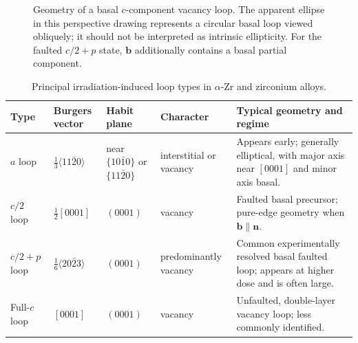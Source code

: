 \documentclass[11pt]{article}
\newcommand{\bvec}{\bm b}
\newcommand{\nvec}{\bm n}
\begin{document}
\begin{figure}[htbp]
\centering
{}
\caption{Geometry of a basal $c$-component vacancy loop. The apparent ellipse in this perspective drawing represents a circular basal loop viewed obliquely; it should not be interpreted as intrinsic ellipticity. For the faulted $c/2+p$ state, $\bvec$ additionally contains a basal partial component.}
\label{fig:c-loop}
\end{figure}

\begin{table}[htbp]
\centering
\caption{Principal irradiation-induced loop types in $\alpha$-Zr and zirconium alloys.}
\label{tab:loop-types}
\begin{tabularx}{\textwidth}{@{}l l l l X@{}}
\toprule
Type & Burgers vector & Habit plane & Character & Typical geometry and regime \\
\midrule
$a$ loop & $\tfrac13\langle11\bar20\rangle$ & near $\{10\bar10\}$ or $\{11\bar20\}$ & interstitial or vacancy & Appears early; generally elliptical, with major axis near $[0001]$ and minor axis basal. \\
$c/2$ loop & $\tfrac12[0001]$ & $(0001)$ & vacancy & Faulted basal precursor; pure-edge geometry when $\bvec\parallel\nvec$. \\
$c/2+p$ loop & $\tfrac16\langle20\bar23\rangle$ & $(0001)$ & predominantly vacancy & Common experimentally resolved basal faulted loop; appears at higher dose and is often large. \\
Full-$c$ loop & $[0001]$ & $(0001)$ & vacancy & Unfaulted, double-layer vacancy loop; less commonly identified. \\
\bottomrule
\end{tabularx}
\end{table}
\end{document}
